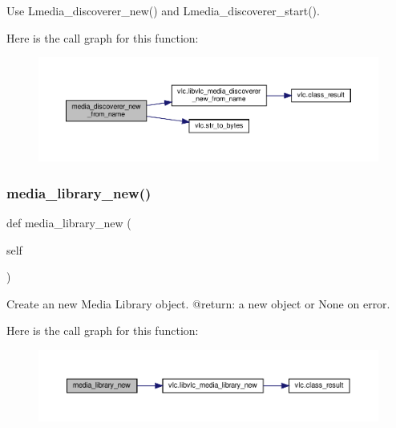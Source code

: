 \begin{DoxyVerb}\deprecated Use L{media_discoverer_new}() and L{media_discoverer_start}().
\end{DoxyVerb}
 Here is the call graph for this function\+:
\nopagebreak
\begin{figure}[H]
\begin{center}
\leavevmode
\includegraphics[width=350pt]{classvlc_1_1_instance_a177b455743be628db069909aa98c83d6_cgraph}
\end{center}
\end{figure}
\mbox{\label{classvlc_1_1_instance_a1a0fe5012ac0f18e8b6dcbf35ac83780}} 
\subsubsection{\texorpdfstring{media\+\_\+library\+\_\+new()}{media\_library\_new()}}
{\footnotesize\ttfamily def media\+\_\+library\+\_\+new (\begin{DoxyParamCaption}\item[{}]{self }\end{DoxyParamCaption})}

\begin{DoxyVerb}Create an new Media Library object.
@return: a new object or None on error.
\end{DoxyVerb}
 Here is the call graph for this function\+:
\nopagebreak
\begin{figure}[H]
\begin{center}
\leavevmode
\includegraphics[width=350pt]{classvlc_1_1_instance_a1a0fe5012ac0f18e8b6dcbf35ac83780_cgraph}
\end{center}
\end{figure}
\mbox{\label{classvlc_1_1_instance_ab3c8e7cd9dd61ca1657ba238cd4cf476}} 
